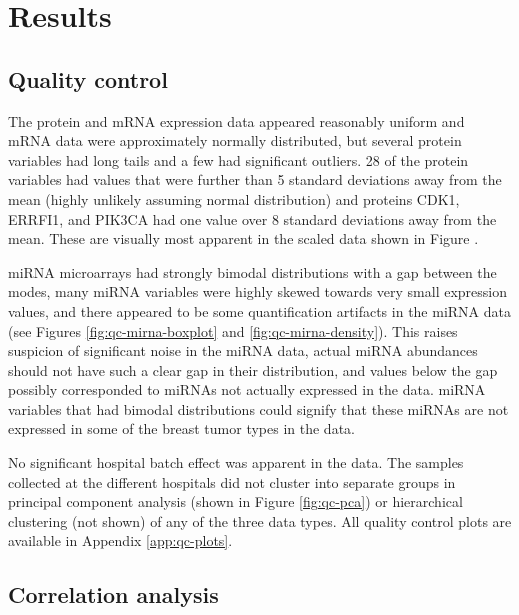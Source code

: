 
\section{Results}


\subsection*{Quality control}

The protein and mRNA expression data appeared reasonably uniform
and mRNA data were approximately normally distributed, but several protein variables had
long tails and a few had significant outliers. 28 of the protein variables had
values that were further than 5 standard deviations away from the mean (highly
unlikely assuming normal distribution) and proteins CDK1, ERRFI1, and PIK3CA
had one value over 8 standard deviations away from the mean. These are
visually most apparent in the scaled data shown in Figure
\label{fig:protein-scaled-variable-boxplot}.

miRNA microarrays had strongly bimodal distributions with a gap between the
modes, many miRNA variables were highly skewed towards very small expression
values, and there appeared to be some quantification artifacts in the miRNA
data (see Figures \ref{fig:qc-mirna-boxplot} and \ref{fig:qc-mirna-density}).
This raises suspicion of significant noise in the miRNA data, actual miRNA
abundances should not have such a clear gap in their distribution, and values
below the gap possibly corresponded to miRNAs not actually expressed in the
data. miRNA variables that had bimodal distributions could signify that these
miRNAs are not expressed in some of the breast tumor types in the data.

No significant hospital batch effect was apparent in the data. The samples
collected at the different hospitals did not cluster into separate groups in
principal component analysis (shown in Figure \ref{fig:qc-pca}) or
hierarchical clustering (not shown) of any of the three data types.
All quality control plots are available in Appendix \ref{app:qc-plots}.




\subsection*{Correlation analysis}

